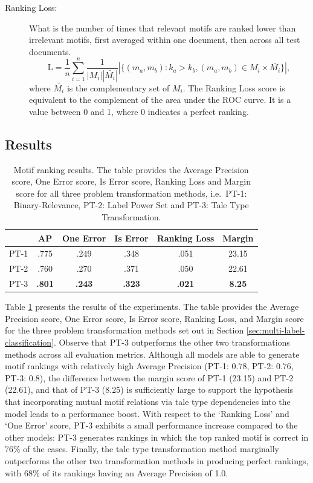 \begin{description}
\item[Ranking Loss:] What is the number of times that relevant motifs are ranked lower than irrelevant motifs, first averaged within one document, then across all test documents.
\begin{equation}
\text{L} = \frac{1}{n} \sum^n_{i=1} \frac{1}{|M_i| |\bar{M_i}|} |\{(m_a, m_b): k_a > k_b, (m_a, m_b) \in M_i \times \bar{M_i}\}|,
\end{equation}
where $\bar{M_i}$ is the complementary set of $M_i$.
The Ranking Loss score is equivalent to the complement of the area under the ROC curve.\autocite{rubin:2012} It is a value between 0 and 1, where 0 indicates a perfect ranking.
\end{description}

\subsection{Results}\label{sec:motif-classification-results}

\begin{table}
\centering
\begin{tabular}{lccccc}
\toprule
     & AP   & One Error & Is Error & Ranking Loss & Margin \\ \midrule
PT-1 & .775 & .249      & .348     & .051      & 23.15 \\
PT-2 & .760 & .270      & .371     & .050      & 22.61 \\
PT-3 & \textbf{.801} & \textbf{.243} & \textbf{.323} & \textbf{.021} & \textbf{8.25} \\
\bottomrule
\end{tabular}
\caption{Motif ranking results. The table provides the Average Precision score, One Error score, Is Error score, Ranking Loss and Margin score for all three problem transformation methods, i.e.\ PT-1: Binary-Relevance, PT-2: Label Power Set and PT-3: Tale Type Transformation.}
\label{tab:motif-ranking-results}
\end{table}

Table \ref{tab:motif-ranking-results} presents the results of the experiments. The table provides the Average Precision score, One Error score, Is Error score, Ranking Loss, and Margin score for the three problem transformation methods set out in Section \ref{sec:multi-label-classification}. Observe that PT-3 outperforms the other two transformations methods across all evaluation metrics. Although all models are able to generate motif rankings with relatively high Average Precision (PT-1: $0.78$, PT-2: $0.76$, PT-3: $0.8$), the difference between the margin score of PT-1 (23.15) and PT-2 (22.61), and that of PT-3 (8.25) is sufficiently large to support the hypothesis that incorporating mutual motif relations via tale type dependencies into the model leads to a performance boost. With respect to the `Ranking Loss' and `One Error' score, PT-3 exhibits a small performance increase compared to the other models: PT-3 generates rankings in which the top ranked motif is correct in 76\% of the cases. Finally, the tale type transformation method marginally outperforms the other two transformation methods in producing perfect rankings, with 68\% of its rankings having an Average Precision of 1.0.

